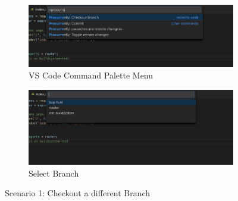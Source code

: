 \begin{figure}[h]
    \begin{subfigure}{.5\textwidth}
        \centering
        \includegraphics[width=1\linewidth]{figures/screenshots/scenarios/1checkout_branch.png}
        \caption{VS Code Command Palette Menu}
        \label{fig:1checkout_branch_palette}
    \end{subfigure}
    \begin{subfigure}{.5\textwidth}
        \centering
        \includegraphics[width=1\linewidth]{figures/screenshots/scenarios/1checkout_bughunt.png}
        \caption{Select Branch}
        \label{fig:1checkout_bughunt}
    \end{subfigure}
    \caption{Scenario 1: Checkout a different Branch}
\end{figure}

